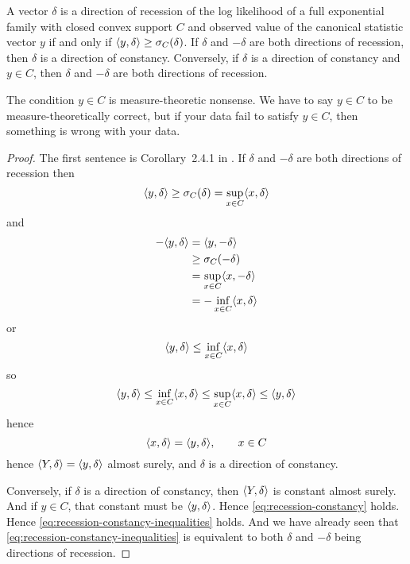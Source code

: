 \begin{theorem} \label{th:recession-constancy}
A vector $\delta$ is a direction of recession of the log likelihood of
a full exponential family
with closed convex support $C$ and observed value of the canonical statistic
vector $y$ if and only if $\langle y, \delta \rangle \ge \sigma_C(\delta)$.
If $\delta$ and $- \delta$ are both directions of recession, then $\delta$
is a direction of constancy.
Conversely, if $\delta$ is a direction of constancy and $y \in C$,
then $\delta$ and $- \delta$ are both directions of recession.
\end{theorem}
The condition $y \in C$ is measure-theoretic nonsense.
We have to say $y \in C$ to be measure-theoretically correct, but
if your data fail to satisfy $y \in C$, then something is wrong with your data.
\begin{proof}
The first sentence is Corollary~{2.4.1} in \citet{geyer-thesis}.
If $\delta$ and $- \delta$ are both directions of recession then
$$
   \langle y, \delta \rangle \ge \sigma_C(\delta) = \sup_{x \in C} \langle x, \delta \rangle
$$
and
\begin{align*}
   - \langle y, \delta \rangle
   & =
   \langle y, - \delta \rangle
   \\
   & \ge
   \sigma_C(- \delta)
   \\
   & =
   \sup_{x \in C} \langle x, - \delta \rangle
   \\
   & =
   - \inf_{x \in C} \langle x, \delta \rangle
\end{align*}
or
$$
   \langle y, \delta \rangle \le \inf_{x \in C} \langle x, \delta \rangle
$$
so
\begin{equation} \label{eq:recession-constancy-inequalities}
   \langle y, \delta \rangle \le \inf_{x \in C} \langle x, \delta \rangle
   \le
   \sup_{x \in C} \langle x, \delta \rangle \le \langle y, \delta \rangle 
\end{equation}
hence
\begin{equation} \label{eq:recession-constancy}
   \langle x, \delta \rangle = \langle y, \delta \rangle, \qquad x \in C
\end{equation}
hence $\langle Y, \delta \rangle = \langle y, \delta \rangle$ almost surely,
and $\delta$ is a direction of constancy.

Conversely, if $\delta$ is a direction of constancy, then $\langle Y, \delta \rangle$
is constant almost surely.  And if $y \in C$, that constant must
be $\langle y, \delta \rangle$.  Hence \eqref{eq:recession-constancy} holds.
Hence \eqref{eq:recession-constancy-inequalities} holds.
And we have already seen that \eqref{eq:recession-constancy-inequalities}
is equivalent to both $\delta$ and $- \delta$ being directions of recession.
\end{proof}

